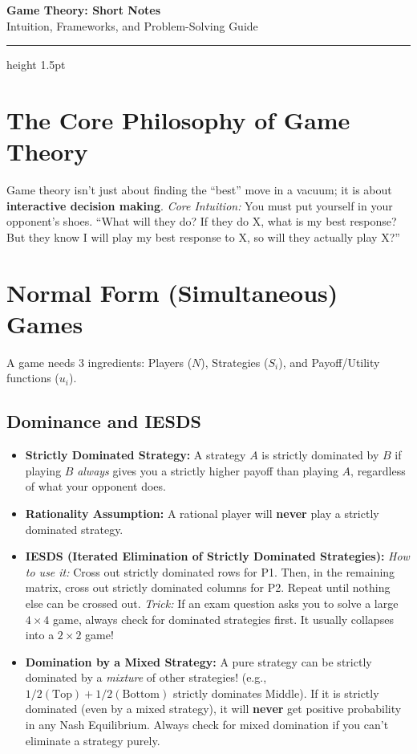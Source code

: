 \documentclass[12pt, a4paper]{article}
\begin{document}
\begin{center}
  {\LARGE\bfseries\sffamily\color{defblue} Game Theory: Short Notes}\\[6pt]
  {\Large\sffamily Intuition, Frameworks, and Problem-Solving Guide}\\[4pt]
\end{center}
\vspace{0.3cm}
\hrule height 1.5pt
\vspace{0.6cm}

\section{The Core Philosophy of Game Theory}
Game theory isn't just about finding the ``best'' move in a vacuum; it is about \textbf{interactive decision making}. 
\textit{Core Intuition:} You must put yourself in your opponent's shoes. ``What will they do? If they do X, what is my best response? But they know I will play my best response to X, so will they actually play X?''

\section{Normal Form (Simultaneous) Games}

A game needs 3 ingredients: Players ($N$), Strategies ($S_i$), and Payoff/Utility functions ($u_i$).

\subsection{Dominance and IESDS}
\begin{itemize}
    \item \textbf{Strictly Dominated Strategy:} A strategy $A$ is strictly dominated by $B$ if playing $B$ \textit{always} gives you a strictly higher payoff than playing $A$, regardless of what your opponent does.
    \item \textbf{Rationality Assumption:} A rational player will \textbf{never} play a strictly dominated strategy.
    \item \textbf{IESDS (Iterated Elimination of Strictly Dominated Strategies):} 
    \textit{How to use it:} Cross out strictly dominated rows for P1. Then, in the remaining matrix, cross out strictly dominated columns for P2. Repeat until nothing else can be crossed out. 
    \textit{Trick:} If an exam question asks you to solve a large $4 \times 4$ game, always check for dominated strategies first. It usually collapses into a $2 \times 2$ game!
    \item \textbf{Domination by a Mixed Strategy:} A pure strategy can be strictly dominated by a \textit{mixture} of other strategies! (e.g., $1/2(\text{Top}) + 1/2(\text{Bottom})$ strictly dominates Middle). If it is strictly dominated (even by a mixed strategy), it will \textbf{never} get positive probability in any Nash Equilibrium. Always check for mixed domination if you can't eliminate a strategy purely.
\end{itemize}
\end{document}

